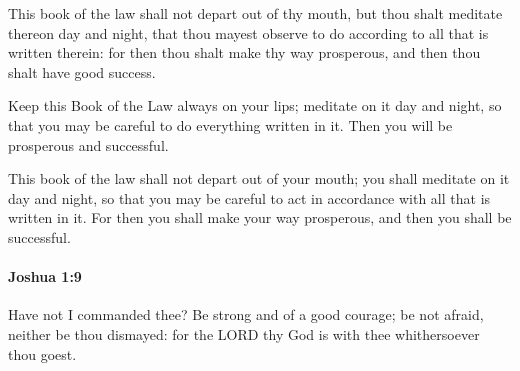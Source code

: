 			\begin{versebox}
					\item[BHS] 
					\item[ASV] This book of the law shall not depart out of thy mouth, but thou shalt meditate thereon day and night, that thou mayest observe to do according to all that is written therein: for then thou shalt make thy way prosperous, and then thou shalt have good success.
					\item[NIV] Keep this Book of the Law always on your lips; meditate on it day and night, so that you may be careful to do everything written in it. Then you will be prosperous and successful.
					\item[NRSV] This book of the law shall not depart out of your mouth; you shall meditate on it day and night, so that you may be careful to act in accordance with all that is written in it. For then you shall make your way prosperous, and then you shall be successful.
			\end{versebox}

		\paragraph{Joshua 1:9} %
			\label{JOSHUA-1-9}

			Have not I commanded thee? Be strong and of a good courage; be not afraid, neither be thou dismayed: for the LORD thy God is with thee whithersoever thou goest.

